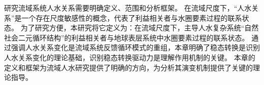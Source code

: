 研究流域系统人\textendash{}水关系需要明确定义、范围和分析框架。
在流域尺度下，“人\textendash{}水关系”是一个存在尺度敏感性的概念，代表了利益相关者与水圈要素过程的联系状态。
为了研究方便，本研究将它定义为：在流域尺度下，主导人水复杂系统“自然\textendash{}社会二元循环结构”的利益相关者与地球表层系统中水圈要素过程的联系状态。
通过强调人\textendash{}水关系变化是流域系统反馈循环模式的重组，本章明确了稳态转换是识别人\textendash{}水关系变化的理论基础，识别稳态转换驱动力是理解作用机制的关键。
本章的定义和框架为流域人水研究提供了明确的方向，为分析其演变机制提供了关键的理论指导。
